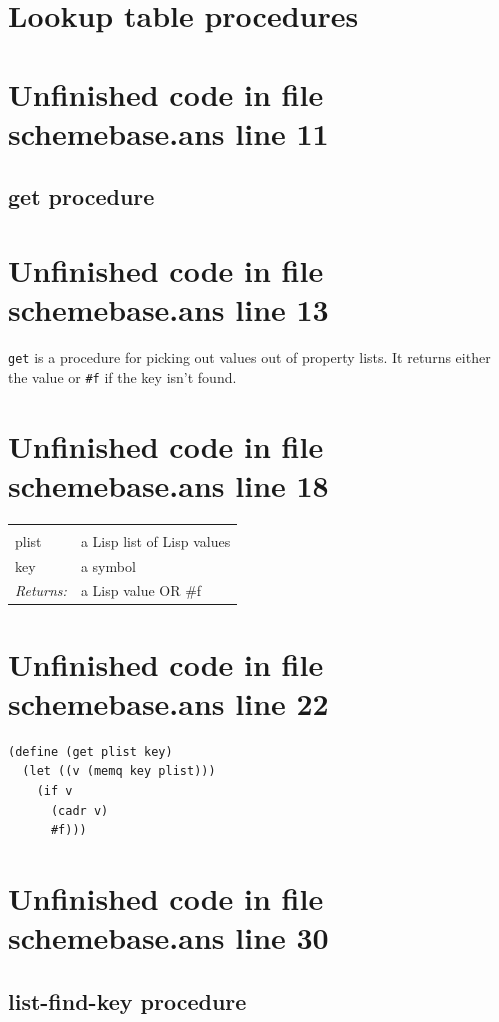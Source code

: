 \documentclass[twoside,9pt]{report}
\begin{document}
\section{Lookup table procedures}
\label{lookup-table-procedures}
\section{Unfinished code in file schemebase.ans line 11}
\subsection{get procedure}
\label{get-procedure}
\section{Unfinished code in file schemebase.ans line 13}


\texttt{get} is a procedure for picking out values out of property lists. It returns either the value or \texttt{\#f} if the key isn't found.

\section{Unfinished code in file schemebase.ans line 18}
\noindent\begin{tabular}{ |p{1.9cm} p{8cm}| }
\hline
\rowcolor[HTML]{CCCCCC} \multicolumn{2}{|l|}{\bf get (public)} \\
plist & a Lisp list of Lisp values \\
key & a symbol \\
\textit{Returns:} & a Lisp value OR \#f \\
\hline
\end{tabular}
\section{Unfinished code in file schemebase.ans line 22}
\begin{lstlisting}
(define (get plist key)
  (let ((v (memq key plist)))
    (if v
      (cadr v)
      #f)))
\end{lstlisting}
\section{Unfinished code in file schemebase.ans line 30}
\subsection{list-find-key procedure}
\label{list-find-key-procedure}
\end{document}
